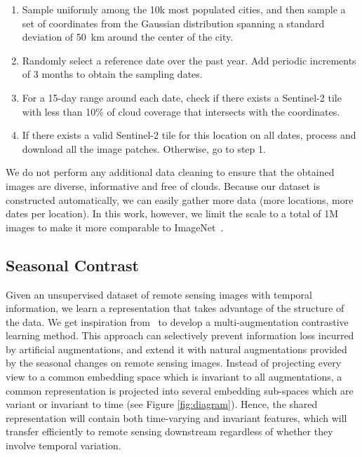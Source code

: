 \documentclass[10pt,twocolumn,letterpaper]{article}
\begin{document}
\begin{enumerate}[nolistsep]
    \item Sample uniformly among the 10k most populated cities, and then sample a set of coordinates from the Gaussian distribution spanning a standard deviation of 50~km around the center of the city.
    \item Randomly select a reference date over the past year. Add periodic increments of 3 months to obtain the sampling dates.
    \item For a 15-day range around each date, check if there exists a Sentinel-2 tile with less than 10\% of cloud coverage that intersects with the coordinates.
    \item If there exists a valid Sentinel-2 tile for this location on all dates, process and download all the image patches. Otherwise, go to step 1.
\end{enumerate}

We do not perform any additional data cleaning to ensure that the obtained images are diverse, informative and free of clouds. Because our dataset is constructed automatically, we can easily gather more data (more locations, more dates per location). In this work, however, we limit the scale to a total of 1M images to make it more comparable to ImageNet~\cite{russakovsky2014imagenet}. 

\subsection{Seasonal Contrast}\label{ssec:seasonal_contrast}
Given an unsupervised dataset of remote sensing images with temporal information, we learn a representation that takes advantage of the structure of the data. We get inspiration from~\cite{xiao2020should} to develop a multi-augmentation contrastive learning method. This approach can selectively prevent information loss incurred by artificial augmentations, and extend it with natural augmentations provided by the seasonal changes on remote sensing images. Instead of projecting every view to a common embedding space which is invariant to all augmentations, a common representation is projected into several embedding sub-spaces which are variant or invariant to time (see Figure \ref{fig:diagram}). Hence, the shared representation will contain both time-varying and invariant features, which will transfer efficiently to remote sensing downstream regardless of whether they involve temporal variation.
\end{document}
